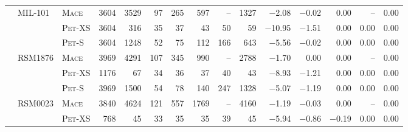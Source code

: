 \begin{tabular}{lllr rrrrrr rrrrr}
\addlinespace
                  &           MIL-101  &     \textsc{Mace}  &        \num{3604}  &        \num{3529}  &          \num{97}  &         \num{265}  &         \num{597}  &                --  &        \num{1327}  &       \num{-2.08}  &       \num{-0.02}  &        \num{0.00}  &                --  &        \num{0.00} \\ 
                  &                    &   \textsc{Pet}-XS  &        \num{3604}  &         \num{316}  &          \num{35}  &          \num{37}  &          \num{43}  &          \num{50}  &          \num{59}  &      \num{-10.95}  &       \num{-1.51}  &        \num{0.00}  &        \num{0.00}  &        \num{0.00} \\ 
                  &                    &    \textsc{Pet}-S  &        \num{3604}  &        \num{1248}  &          \num{52}  &          \num{75}  &         \num{112}  &         \num{166}  &         \num{643}  &       \num{-5.56}  &       \num{-0.02}  &        \num{0.00}  &        \num{0.00}  &        \num{0.00} \\ 
\addlinespace
                  &           RSM1876  &     \textsc{Mace}  &        \num{3969}  &        \num{4291}  &         \num{107}  &         \num{345}  &         \num{990}  &                --  &        \num{2788}  &       \num{-1.70}  &        \num{0.00}  &        \num{0.00}  &                --  &        \num{0.00} \\ 
                  &                    &   \textsc{Pet}-XS  &        \num{1176}  &          \num{67}  &          \num{34}  &          \num{36}  &          \num{37}  &          \num{40}  &          \num{43}  &       \num{-8.93}  &       \num{-1.21}  &        \num{0.00}  &        \num{0.00}  &        \num{0.00} \\ 
                  &                    &    \textsc{Pet}-S  &        \num{3969}  &        \num{1500}  &          \num{54}  &          \num{78}  &         \num{140}  &         \num{247}  &        \num{1328}  &       \num{-5.07}  &       \num{-1.19}  &        \num{0.00}  &        \num{0.00}  &        \num{0.00} \\ 
\addlinespace
                  &           RSM0023  &     \textsc{Mace}  &        \num{3840}  &        \num{4624}  &         \num{121}  &         \num{557}  &        \num{1769}  &                --  &        \num{4160}  &       \num{-1.19}  &       \num{-0.03}  &        \num{0.00}  &                --  &        \num{0.00} \\ 
                  &                    &   \textsc{Pet}-XS  &         \num{768}  &          \num{45}  &          \num{33}  &          \num{35}  &          \num{35}  &          \num{39}  &          \num{45}  &       \num{-5.94}  &       \num{-0.86}  &       \num{-0.19}  &        \num{0.00}  &        \num{0.00} \\ 

\end{tabular}
